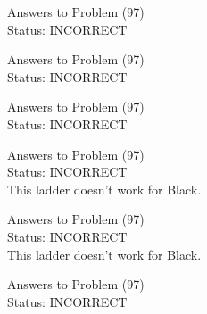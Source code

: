 \documentclass[11pt]{article}
\begin{document}
\begin{minipage}[t]{0.5\textwidth}
  {\centering
  
  Answers to Problem (97)\\
  Status: INCORRECT\\
  
  }
\end{minipage}
\begin{minipage}[t]{0.5\textwidth}
  {\centering
  
  Answers to Problem (97)\\
  Status: INCORRECT\\
  
  }
\end{minipage}
\begin{minipage}[t]{0.5\textwidth}
  {\centering
  
  Answers to Problem (97)\\
  Status: INCORRECT\\
  
  }
\end{minipage}
\begin{minipage}[t]{0.5\textwidth}
  {\centering
  
  Answers to Problem (97)\\
  Status: INCORRECT\\
  This ladder doesn't work for Black.\\
  }
\end{minipage}
\begin{minipage}[t]{0.5\textwidth}
  {\centering
  
  Answers to Problem (97)\\
  Status: INCORRECT\\
  This ladder doesn't work for Black.\\
  }
\end{minipage}
\begin{minipage}[t]{0.5\textwidth}
  {\centering
  
  Answers to Problem (97)\\
  Status: INCORRECT\\
  
  }
\end{minipage}
\end{document}
